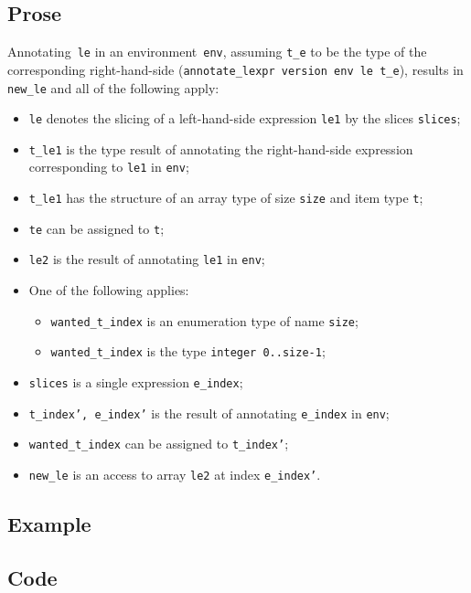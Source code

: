 \documentclass{book}
\begin{document}
  \subsection{Prose}
   Annotating~\texttt{le} in an environment~\texttt{env}, assuming
\texttt{t\_e} to be the type of the corresponding right-hand-side
(\texttt{annotate\_lexpr version env le t\_e}), results in \texttt{new\_le} and
all of the following apply:
   \begin{itemize}
   \item \texttt{le} denotes the slicing of a left-hand-side expression \texttt{le1} by the slices \texttt{slices};
   \item \texttt{t\_le1} is the type result of annotating the right-hand-side expression corresponding to \texttt{le1} in \texttt{env};
   \item \texttt{t\_le1} has the structure of an array type of size \texttt{size} and item type \texttt{t};
   \item \texttt{te} can be assigned to \texttt{t};
   \item \texttt{le2} is the result of annotating \texttt{le1} in \texttt{env};
   \item One of the following applies:
     \begin{itemize}
     \item \texttt{wanted\_t\_index} is an enumeration type of name \texttt{size};
     \item \texttt{wanted\_t\_index} is the type \texttt{integer {0..size-1}};
     \end{itemize}
   \item \texttt{slices} is a single expression \texttt{e\_index};
   \item \texttt{t\_index', e\_index'} is the result of annotating \texttt{e\_index} in \texttt{env};
   \item \texttt{wanted\_t\_index} can be assigned to \texttt{t\_index'};
   \item \texttt{new\_le} is an access to array \texttt{le2} at index \texttt{e\_index'}.
   \end{itemize}

  \subsection{Example}

  \subsection{Code}
\end{document}

